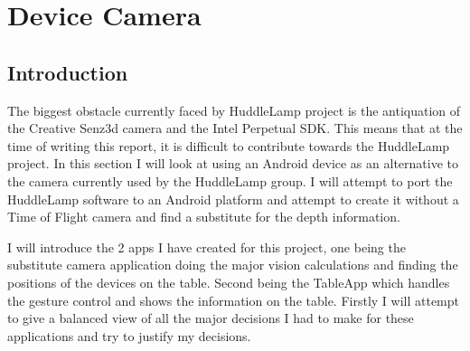 \chapter{Device Camera}
 
\label{ch:devcamera}
\section{Introduction}
 
The biggest obstacle currently faced by HuddleLamp project is the antiquation of the Creative Senz3d camera and the Intel Perpetual SDK\cite{obsolete_perpetual_sdk}. This means that at the time of writing this report, it is difficult to contribute towards the HuddleLamp project. In this section I will look at using an Android device as an alternative to the camera currently used by the HuddleLamp group. I will attempt to port the HuddleLamp software to an Android platform and attempt to create it without a Time of Flight camera and find a substitute for the depth information.

I will introduce the 2 apps I have created for this project, one being the substitute camera application doing the major vision calculations and finding the positions of the devices on the table. Second being the TableApp which handles the gesture control and shows the information on the table. Firstly I will attempt to give a balanced view of all the major decisions I had to make for these applications and try to justify my decisions.